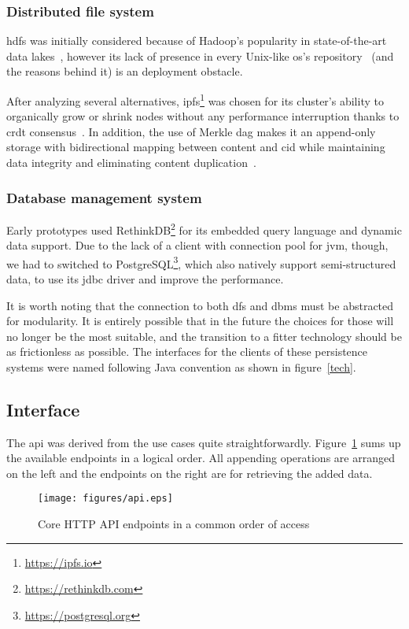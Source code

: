 \subsubsection{Distributed file system}
\gls{hdfs} was initially considered because of Hadoop's popularity
in state-of-the-art data lakes~\cite{lake}, however its lack of presence
in every Unix-like \gls{os}'s repository~\cite{hdfs} (and the reasons behind it)
is an deployment obstacle.

After analyzing several alternatives, \gls{ipfs}\footnote{\url{https://ipfs.io}}
was chosen for its cluster's ability to organically grow or shrink nodes
without any performance interruption thanks to \gls{crdt} consensus~\cite{crdt}.
In addition, the use of Merkle \gls{dag} makes it an append-only storage
with bidirectional mapping between content and \gls{cid} while maintaining
data integrity and eliminating content duplication~\cite{ipfs}.

\subsubsection{Database management system}
Early prototypes used RethinkDB\footnote{\url{https://rethinkdb.com}}
for its embedded query language and dynamic data support.  Due to the lack
of a client with connection pool for \gls{jvm}, though, we had to switched to
PostgreSQL\footnote{\url{https://postgresql.org}}, which also natively support
semi-structured data, to use its \gls{jdbc} driver and improve the performance.

It is worth noting that the connection to both \gls{dfs} and \gls{dbms}
must be abstracted for modularity.  It is entirely possible that in the future
the choices for those will no longer be the most suitable, and the transition
to a fitter technology should be as frictionless as possible.  The interfaces
for the clients of these persistence systems were named following
Java convention as shown in figure~\ref{tech}.

\subsection{Interface}
The \gls{api} was derived from the use cases quite straightforwardly.
Figure~\ref{api} sums up the available endpoints in a logical order.
All appending operations are arranged on the left and the endpoints
on the right are for retrieving the added data.
\begin{figure}
  \texttt{[image: figures/api.eps]}
  \caption{Core HTTP API endpoints in a common order of access}
  \label{api}
\end{figure}

